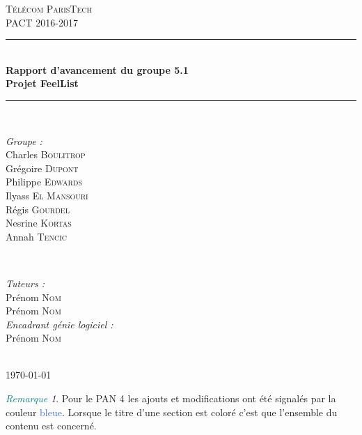 \documentclass[a4paper,10pt]{report}
\theoremstyle{remark}
\newtheorem*{rem}{\textcolor{Teal}{Remarque}}
\begin{document}


\begin{titlepage}
	\newcommand{\HRule}{\rule{\linewidth}{0.5mm}}

	\center

	\textsc{\LARGE Télécom ParisTech}\\[1.2cm]
	\textsc{\Large PACT 2016-2017}\\[0.5cm]

	\HRule \\[0.8cm]
	{ \huge \bfseries Rapport d'avancement du groupe 5.1}\\[0.4cm]
	{ \huge \bfseries Projet FeelList}\\[0.4cm]
	\HRule \\[1.5cm]

	\begin{minipage}{0.4\textwidth}
	\begin{flushleft} \large
	\emph{Groupe :}\\
	Charles \textsc{Boulitrop}\\
	Grégoire \textsc{Dupont}\\
	Philippe \textsc{Edwards}\\
	Ilyass \textsc{El Mansouri}\\
	Régis \textsc{Gourdel} \\
	Nesrine \textsc{Kortas}\\
	Annah \textsc{Tencic}\\
	\end{flushleft}
	\end{minipage}
	~
	\begin{minipage}{0.4\textwidth}
	\begin{flushright} \large
	\emph{Tuteurs :} \\
	Prénom \textsc{Nom}\\
	Prénom \textsc{Nom}\\
	\vspace{1em}
	\emph{Encadrant génie logiciel :}\\
	Prénom \textsc{Nom} \\
	\end{flushright}
	\end{minipage}\\[1.3cm]

	{\large \today}\\[0.9cm]

	\begin{rem}
		Pour le PAN 4 les ajouts et modifications ont été signalés par la couleur \textcolor{RoyalBlue}{bleue}.
		Lorsque le titre d'une section est coloré c'est que l'ensemble du contenu est concerné.\\[0.9cm]
	\end{rem}


\end{titlepage}
\end{document}

